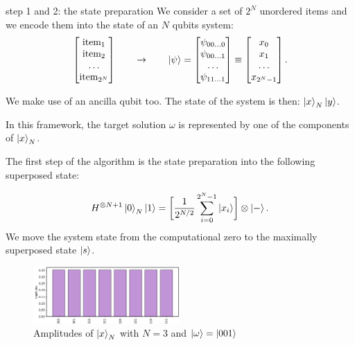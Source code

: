 \documentclass[aspectratio=169, 8pt, xcolor={svgnames}, hyperref={linkcolor=black}]{beamer}
\begin{document}
\begin{frame}{step 1 and 2: the state preparation}
We consider a set of $2^N$ unordered items and we encode them into the state of 
an $N$ qubits system: 
$$ 
\begin{bmatrix}
\text{item}_1 \\
\text{item}_2 \\
\dots \\
\text{item}_{2^N}
\end{bmatrix} \qquad \to \qquad 
\ket{\psi} = \begin{bmatrix}
\psi_{00 \dots 0} \\
\psi_{00 \dots 1}  \\
\dots \\
\psi_{11 \dots 1}
\end{bmatrix}  
\equiv 
\begin{bmatrix}
x_0 \\
x_1  \\
\dots \\
x_{2^N-1}
\end{bmatrix} . 
$$
\pause 

We make use of an ancilla qubit too. The state of the system is then: $\ket{x}_N \ket{y}$. \pause

In this framework, the target solution $\omega$ is represented by one of the components of $\ket{x}_N$. \pause

The first step of the algorithm is the state preparation into the following superposed state:
\begin{multicols}{2}
$$ H^{\otimes N + 1} \ket{0}_N \ket{1} = \biggl[ \frac{1}{2^{N/2}}\sum_{i=0}^{2^N - 1} \ket{x_i} \biggr] \otimes \ket{-}. $$
\textcolor{carnelian}{We move the system state from the computational zero
to the maximally superposed state $\ket{s}$.}

\begin{figure}
   \includegraphics[width=0.5\textwidth]{figures/state1.png}
   \caption*{Amplitudes of $\ket{x}_N$ with $N=3$ and $\ket{\omega} = \ket{001}$}
\end{figure}
\end{multicols}

\end{frame}
\end{document}
